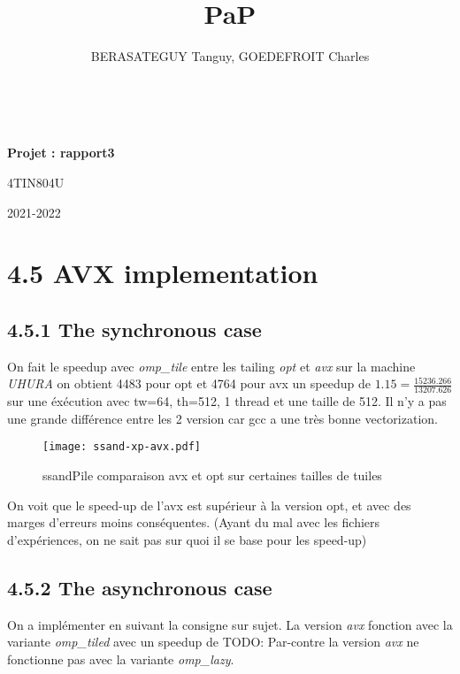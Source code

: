 \documentclass[10pt, a4paper]{article}
\title{PaP}
\author{BERASATEGUY Tanguy, GOEDEFROIT Charles}
\begin{document}
\begin{titlepage}
  \centering
  \ {} %
  \vfill
  \vspace{1cm}
  {\scshape\LARGE\MyTitle\par}
  \vspace{0.5cm}
  {\huge\bfseries Projet : rapport3\par}
  \vspace{0.5cm}
  {\Large 4TIN804U\par}
  \vspace{1cm}
  \MyAuthor
  \vfill
  {\large2021-2022\par}
\end{titlepage}

\newpage

\tableofcontents

\newpage

\section{4.5 AVX implementation}

\subsection{4.5.1 The synchronous case}

On fait le speedup avec \emph{omp\_tile} entre les tailing \emph{opt} et \emph{avx} sur la machine
\emph{UHURA} on obtient 4483 pour opt et 4764 pour avx un speedup de $1.15 =\frac{15236.266}{13207.626}$
sur une éxécution avec tw=64, th=512, 1 thread et une taille de 512.
Il n'y a pas une grande différence entre les 2 version car gcc a une très bonne vectorization.

\begin{figure}[H]
  \centering
  \texttt{[image: ssand-xp-avx.pdf]}
  \caption{\small{ssandPile comparaison avx et opt sur certaines tailles de tuiles}}
\end{figure}

On voit que le speed-up de l'avx est supérieur à la version opt, et avec des marges d'erreurs
moins conséquentes.
(Ayant du mal avec les fichiers d'expériences, on ne sait pas sur quoi il se base pour les speed-up)

\subsection{4.5.2 The asynchronous case}

On a implémenter en suivant la consigne sur sujet.
La version \emph{avx} fonction avec la variante \emph{omp\_tiled} avec un speedup de TODO:
Par-contre la version \emph{avx} ne fonctionne pas avec la variante \emph{omp\_lazy}.
\end{document}
